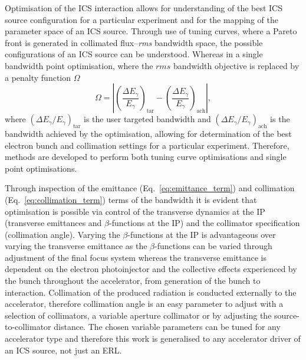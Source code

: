 \documentclass[../main.tex]{subfiles}
\begin{document}
Optimisation of the ICS interaction allows for understanding of the best ICS source configuration for a particular experiment and for the mapping of the parameter space of an ICS source. Through use of tuning curves, where a Pareto front is generated in collimated flux--\textit{rms} bandwidth space, the possible configurations of an ICS source can be understood. Whereas in a single bandwidth point optimisation, where the $\textit{rms}$ bandwidth objective is replaced by a penalty function $\Omega$
\begin{equation}
\Omega = \left|\left(\frac{\Delta E_{\gamma}}{E_{\gamma}}\right)_{\mathrm{tar}}-\left(\frac{\Delta E_{\gamma}}{E_{\gamma}}\right)_{\mathrm{ach}}\right|,
\label{eq:penalty_function}
\end{equation}
where $\left(\Delta E_{\gamma}/E_{\gamma}\right)_{\mathrm{tar}}$ is the user targeted bandwidth and $\left(\Delta E_{\gamma}/E_{\gamma}\right)_{\mathrm{ach}}$ is the bandwidth achieved by the optimisation, allowing for determination of the best electron bunch and collimation settings for a particular experiment. Therefore, methods are developed to perform both tuning curve optimisations and single point optimisations.

Through inspection of the emittance (Eq.~\ref{eq:emittance_term}) and collimation (Eq.~\ref{eq:collimation_term}) terms of the bandwidth it is evident that optimisation is possible via control of the transverse dynamics at the IP (transverse emittances and $\beta$-functions at the IP) and the collimator specification (collimation angle). Varying the $\beta$-functions at the IP is advantageous over varying the transverse emittance as the $\beta$-functions can be varied through adjustment of the final focus system whereas the transverse emittance is dependent on the electron photoinjector and the collective effects experienced by the bunch throughout the accelerator, from generation of the bunch to interaction. Collimation of the produced radiation is conducted externally to the accelerator, therefore collimation angle is an easy parameter to adjust with a selection of collimators, a variable aperture collimator or by adjusting the source-to-collimator distance. The chosen variable parameters can be tuned for any accelerator type and therefore this work is generalised to any accelerator driver of an ICS source, not just an ERL.
\end{document}
